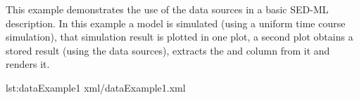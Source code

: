 This example demonstrates the use of the data sources in a basic SED-ML description. In this example a model is simulated (using a uniform time course simulation), that simulation result is plotted in one plot, a second plot obtains a stored result (using the data sources), extracts the  and  column from it and renders it.

%
%

{lst:dataExample1}
{xml/dataExample1.xml}

